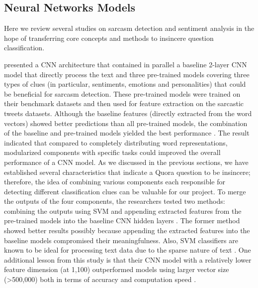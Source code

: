 \documentclass[12pt]{diazessay} %
\begin{document}
\subsection{Neural Networks Models}


Here we review several studies on sarcasm detection and sentiment analysis in the hope of transferring core concepts and methods to insincere question classification.

\citep{poria2017} presented a CNN architecture that contained in parallel a baseline 2-layer CNN model that directly process the text and three pre-trained models covering three types of clues (in particular, sentiments, emotions and personalities) that could be beneficial for sarcasm detection. These pre-trained models were trained on their benchmark datasets and then used for feature extraction on the sarcastic tweets datasets. Although the baseline features (directly extracted from the word vectors) showed better predictions than all pre-trained models, the combination of the baseline and pre-trained models yielded the best performance \citep{poria2017}. The result indicated that compared to completely distributing word representations, modularized components with specific tasks could improved the overall performance of a CNN model. As we discussed in the previous sections, we have established several characteristics that indicate a Quora question to be insincere; therefore, the idea of combining various components each responsible for detecting different classification clues can be valuable for our project. To merge the outputs of the four components, the researchers tested two methods: combining the outputs using SVM and appending extracted features from the pre-trained models into the baseline CNN hidden layers \citep{poria2017}. The former method showed better results possibly because appending the extracted features into the baseline models compromised their meaningfulness. Also, SVM classifiers are known to be ideal for processing text data due to the sparse nature of text \citep{medhat2014}. One additional lesson from this study is that their CNN model with a relatively lower feature dimension (at 1,100) outperformed models using larger vector size (>500,000) both in terms of accuracy and computation speed \citep{poria2017}. 
\end{document}
